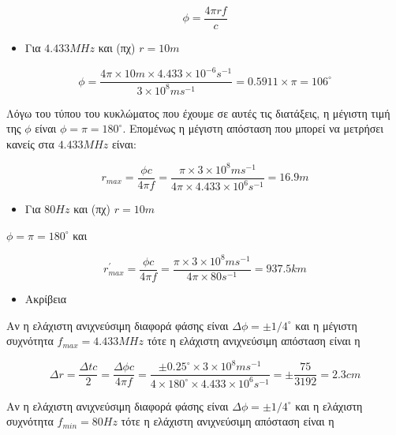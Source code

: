 \documentclass[a4paper,11pt,titlepage]{article}
\newcommand{\degrees}{^{\circ}}
\begin{document}
\begin{equation}
 \phi= \frac{4\pi rf}{c}
\end{equation}

\begin{itemize}
 \item Για $4.433MHz$ και (πχ) $r=10m$
\end{itemize}

\begin{equation}
 \phi=\frac{4\pi \times10m \times 4.433\times10^{-6}s^{-1}}{3\times10^8ms^{-1}}=0.5911\times\pi=106\degrees
\end{equation}

Λόγω του τύπου του κυκλώματος που έχουμε σε αυτές τις διατάξεις, η μέγιστη τιμή της $\phi$ είναι $\phi=\pi=180\degrees$. Επομένως η μέγιστη απόσταση που μπορεί να μετρήσει κανείς στα $4.433MHz$ είναι:

\begin{equation}
 r_{max}=\frac{\phi c}{4\pi f}=\frac{\pi\times 3\times10^8ms^{-1}}{4\pi\times 4.433\times10^{6} s^{-1}}=16.9m
\end{equation}

\begin{itemize}
 \item Για $80Hz$ και (πχ) $r=10m$
\end{itemize}

$\phi=\pi=180\degrees$ και 

\begin{equation}
 r^{'}_{max}=\frac{\phi c}{4\pi f}=\frac{\pi\times 3\times10^8ms^{-1}}{4\pi\times 80s^{-1}}=937.5 km
\end{equation}

\begin{itemize}
 \item Ακρίβεια
\end{itemize}

Αν η ελάχιστη ανιχνεύσιμη διαφορά φάσης είναι $\Delta\phi=\pm1/4\degrees$ και η μέγιστη συχνότητα $f_{max}=4.433MHz$ τότε η ελάχιστη ανιχνεύσιμη απόσταση είναι η 

\begin{equation}
 \Delta r=\frac{\Delta tc}{2}=\frac{\Delta\phi c}{4\pi f}=\frac{\pm 0.25\degrees\times 3\times10^8ms^{-1}}{4\times 180\degrees \times 4.433\times10^6s^{-1}}=\pm\frac{75}{3192}=2.3cm
\end{equation}

Αν η ελάχιστη ανιχνεύσιμη διαφορά φάσης είναι $\Delta\phi=\pm1/4\degrees$ και η ελάχιστη συχνότητα $f_{min}=80Hz$ τότε η ελάχιστη ανιχνεύσιμη απόσταση είναι η 
\end{document}
